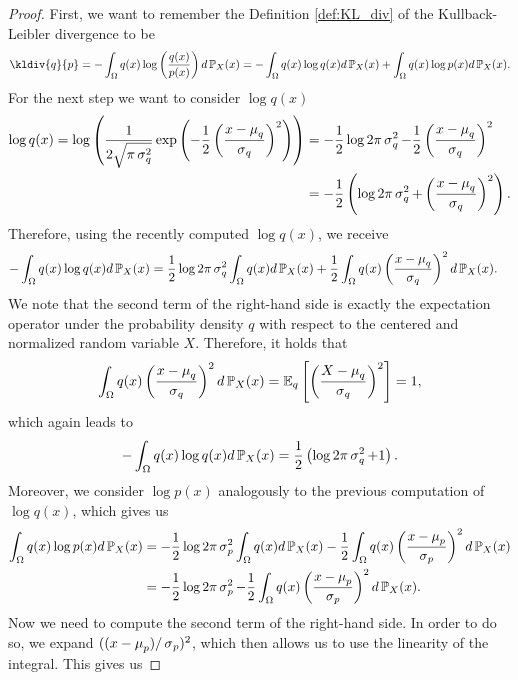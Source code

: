 \begin{proof}
First, we want to remember the Definition \ref{def:KL_div} of the Kullback-Leibler divergence to be
\begin{align*}
\kldiv{q}{p} = - \int_{\O} q(x) \log \left(\frac{q(x)}{p(x)} \right) d\prob_X(x) = - \int_{\O} q(x) \log q(x) d\prob_X(x) + \int_{\O} q(x) \log p(x) d\prob_X(x).
\end{align*}
For the next step we want to consider $\log q(x)$
\begin{align*}
\log q(x) = \log \left( \frac{1}{2\sqrt{\pi \operatorname{\sigma}_q^{2}}} \exp \left( -\frac{1}{2} \left( \frac{x - \operatorname{\mu}_{q}}{\operatorname{\sigma}_{q}} \right)^2 \right) \right) &= - \frac{1}{2}\log 2\pi \operatorname{\sigma}_q^{2} - \frac{1}{2} \left( \frac{x - \operatorname{\mu}_{q}}{\operatorname{\sigma}_{q}} \right)^2\\
&= -\frac{1}{2} \left( \log 2\pi \operatorname{\sigma}_q^{2} + \left( \frac{x - \operatorname{\mu}_{q}}{\operatorname{\sigma}_{q}} \right)^2\right).
\end{align*}
Therefore, using the recently computed $\log q(x)$, we receive
\begin{align*}
- \int_{\Omega} q(x) \log q(x) d\operatorname{\mathbb{P}}_X(x) &= \frac{1}{2} \log 2\pi \operatorname{\sigma}_q^{2} \int_{\Omega} q(x) d\operatorname{\mathbb{P}}_X(x) + \frac{1}{2}\int_{\Omega} q(x) \left( \frac{x - \operatorname{\mu}_{q}}{\operatorname{\sigma}_{q}} \right)^2 d\operatorname{\mathbb{P}}_X(x).
\end{align*}
We note that the second term of the right-hand side is exactly the expectation operator under the probability density $q$ with respect to the centered and normalized random variable $X$. Therefore, it holds that
\begin{align*}
\int_{\Omega} q(x) \left( \frac{x - \operatorname{\mu}_{q}}{\operatorname{\sigma}_{q}} \right)^2 d\operatorname{\mathbb{P}}_X(x) = \operatorname{\mathbb{E}}_{q} \left[\left( \frac{X - \operatorname{\mu}_q}{\operatorname{\sigma}_q} \right)^2 \right] = 1,
\end{align*}
which again leads to
\begin{align*}
- \int_{\Omega} q(x) \log q(x) d\operatorname{\mathbb{P}}_X(x) = \frac{1}{2} \left(\log 2\pi \operatorname{\sigma}_q^{2} + 1\right).
\end{align*}
Moreover, we consider $\log p(x)$ analogously to the previous computation of $\log q(x)$, which gives us
\begin{align*}
\int_{\Omega} q(x) \log p(x) d\operatorname{\mathbb{P}}_X(x) &= - \frac{1}{2} \log 2\pi \operatorname{\sigma}_p^{2} \int_{\Omega} q(x) d\operatorname{\mathbb{P}}_X(x) - \frac{1}{2}\int_{\Omega} q(x) \left( \frac{x - \operatorname{\mu}_{p}}{\operatorname{\sigma}_{p}} \right)^2 d\operatorname{\mathbb{P}}_X(x)\\
&= - \frac{1}{2} \log 2\pi \operatorname{\sigma}_p^{2} - \frac{1}{2}\int_{\Omega} q(x) \left( \frac{x - \operatorname{\mu}_{p}}{\operatorname{\sigma}_{p}} \right)^2 d\operatorname{\mathbb{P}}_X(x).
\end{align*}
Now we need to compute the second term of the right-hand side. In order to do so, we expand $((x- \operatorname{\mu}_p)/\operatorname{\sigma}_p)^2$, which then allows us to use the linearity of the integral. This gives us

\end{proof}
